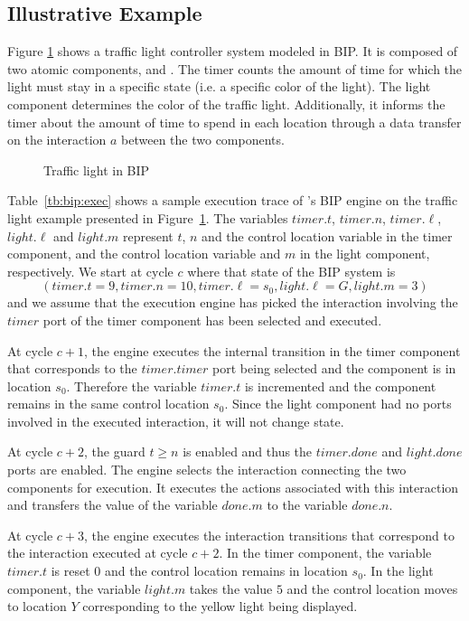 \subsection{Illustrative Example}
Figure \ref{fig:traffic:bip} shows a traffic light controller system modeled in BIP. 
It is composed of two atomic components,  and . The timer counts
the amount of time for which the light must stay in a specific state (i.e. a specific
color of the light).
The light component determines the color of 
the traffic light. Additionally, it
informs the timer about the amount of time to spend in each 
location through a data transfer on the interaction $a$ between the two components. 

\begin{figure}[h!]
 \centering
 \resizebox{0.5\textwidth}{!}{
   
 }
 \caption{Traffic light in BIP}
 \label{fig:traffic:bip}
\end{figure}


Table~\ref{tb:bip:exec} shows a sample execution trace of \mytool's BIP engine
on the traffic light example presented in Figure~\ref{fig:traffic:bip}. The variables 
$timer.t$, $timer.n$, $timer.\ell$, $light.\ell$ and $light.m$ represent $t$, $n$
and the control location variable in the timer component, and the control location variable
and $m$ in the light component, respectively. 
We start at cycle $c$ where that state of the BIP system is $$\left(timer.t = 9, timer.n = 10,
timer.\ell = s_0, light.\ell = G, light.m = 3\right)$$
and we assume that the execution engine has picked the interaction involving the 
$timer$ port of the timer component has been selected and executed. 

At cycle $c+1$, the engine executes the internal transition in the timer component
that corresponds to the $timer.timer$ port being selected and the component is in location $s_0$. 
Therefore the variable $timer.t$ is incremented and the component 
remains in the same control location $s_0$. Since the light component
had no ports involved in the executed interaction, it will not change 
state. 

At cycle $c+2$, the guard $t \geq n$ is enabled and thus the $timer.done$ and $light.done$ ports are enabled. 
The engine selects the interaction connecting the two components
for execution. It executes the actions associated with this interaction 
and transfers the value of the variable $done.m$ to the variable $done.n$.

At cycle $c+3$, the engine executes the interaction transitions that 
correspond to the interaction executed at cycle $c+2$. In the timer 
component, the variable $timer.t$ is reset $0$ and the control location 
remains in location $s_0$. In the light component, the variable 
$light.m$ takes the value $5$ and the control location moves to location 
$Y$ corresponding to the yellow light being displayed. 

